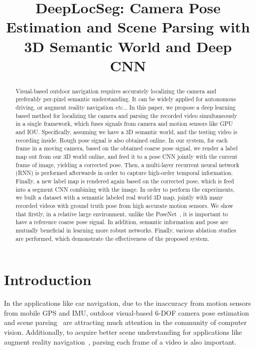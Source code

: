 \documentclass[10pt,twocolumn,letterpaper]{article}
\makeatletter
\DeclareRobustCommand\onedot{\futurelet\@let@token\@onedot}
\def\onedot{\ifx\@let@token.\else.\null\fi\xspace}
\def\eg{\emph{e.g.}}
\def\etc{\emph{etc}\onedot}
\makeatother
\begin{document}
\title{DeepLocSeg: Camera Pose Estimation and Scene Parsing with 3D Semantic World and Deep CNN}

\maketitle

\begin{abstract}
Visual-based outdoor navigation requires accurately localizing the camera and preferably per-pixel semantic understanding. It can be widely applied for autonomous driving, or augment reality navigation \etc.
In this paper, we propose a deep learning based method for localizing the camera and parsing the recorded video simultaneously in a single framework, which fuses signals from camera and motion sensors like GPU and IOU.
Specifically, assuming we have a 3D semantic world, and the testing video is recording inside. Rough pose signal is also obtained online. In our system, for each frame in a moving camera, based on the obtained coarse pose signal, we render a label map out from our 3D world online, and feed it to a pose CNN jointly with the current frame of image, yielding a corrected pose. 
Then, a multi-layer recurrent neural network (RNN) is performed afterwards in order to capture high-order temporal information. 
Finally, a new label map is rendered again based on the corrected pose, which is feed into a segment CNN combining with the image.
In order to perform the experiments,  we built a dataset with a semantic labeled real world 3D map, jointly with many recorded videos with ground truth pose from high accurate motion sensors. We show that firstly, in a relative large environment, unlike the PoseNet~\cite{}, it is important to have a reference coarse pose signal. In addition, semantic information and pose are mutually beneficial in learning more robust networks. Finally, various ablation studies are performed, which demonstrate the effectiveness of the proposed system.
\end{abstract}

\section{Introduction}
\label{sec:introduction}
In the applications like car navigation, due to the inaccuracy from motion sensors from mobile GPS and IMU, outdoor visual-based 6-DOF camera pose estimation and scene parsing~\cite{} are attracting much attention in the community of computer vision. 
Additionally, to acquire better scene understanding for applications like augment reality navigation~\cite{}, parsing each frame of a video is also important.
\end{document}
